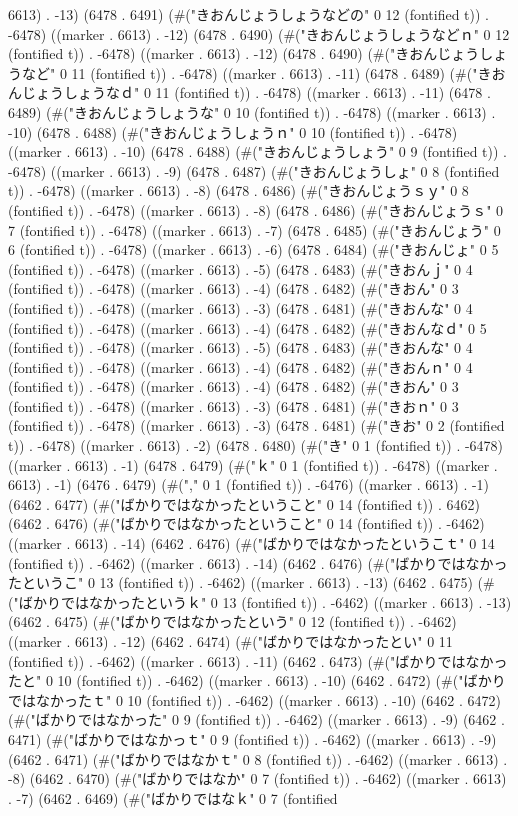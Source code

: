 6613) . -13) (6478 . 6491) (#("きおんじょうしょうなどの" 0 12 (fontified t)) . -6478) ((marker . 6613) . -12) (6478 . 6490) (#("きおんじょうしょうなどｎ" 0 12 (fontified t)) . -6478) ((marker . 6613) . -12) (6478 . 6490) (#("きおんじょうしょうなど" 0 11 (fontified t)) . -6478) ((marker . 6613) . -11) (6478 . 6489) (#("きおんじょうしょうなｄ" 0 11 (fontified t)) . -6478) ((marker . 6613) . -11) (6478 . 6489) (#("きおんじょうしょうな" 0 10 (fontified t)) . -6478) ((marker . 6613) . -10) (6478 . 6488) (#("きおんじょうしょうｎ" 0 10 (fontified t)) . -6478) ((marker . 6613) . -10) (6478 . 6488) (#("きおんじょうしょう" 0 9 (fontified t)) . -6478) ((marker . 6613) . -9) (6478 . 6487) (#("きおんじょうしょ" 0 8 (fontified t)) . -6478) ((marker . 6613) . -8) (6478 . 6486) (#("きおんじょうｓｙ" 0 8 (fontified t)) . -6478) ((marker . 6613) . -8) (6478 . 6486) (#("きおんじょうｓ" 0 7 (fontified t)) . -6478) ((marker . 6613) . -7) (6478 . 6485) (#("きおんじょう" 0 6 (fontified t)) . -6478) ((marker . 6613) . -6) (6478 . 6484) (#("きおんじょ" 0 5 (fontified t)) . -6478) ((marker . 6613) . -5) (6478 . 6483) (#("きおんｊ" 0 4 (fontified t)) . -6478) ((marker . 6613) . -4) (6478 . 6482) (#("きおん" 0 3 (fontified t)) . -6478) ((marker . 6613) . -3) (6478 . 6481) (#("きおんな" 0 4 (fontified t)) . -6478) ((marker . 6613) . -4) (6478 . 6482) (#("きおんなｄ" 0 5 (fontified t)) . -6478) ((marker . 6613) . -5) (6478 . 6483) (#("きおんな" 0 4 (fontified t)) . -6478) ((marker . 6613) . -4) (6478 . 6482) (#("きおんｎ" 0 4 (fontified t)) . -6478) ((marker . 6613) . -4) (6478 . 6482) (#("きおん" 0 3 (fontified t)) . -6478) ((marker . 6613) . -3) (6478 . 6481) (#("きおｎ" 0 3 (fontified t)) . -6478) ((marker . 6613) . -3) (6478 . 6481) (#("きお" 0 2 (fontified t)) . -6478) ((marker . 6613) . -2) (6478 . 6480) (#("き" 0 1 (fontified t)) . -6478) ((marker . 6613) . -1) (6478 . 6479) (#("ｋ" 0 1 (fontified t)) . -6478) ((marker . 6613) . -1) (6476 . 6479) (#("," 0 1 (fontified t)) . -6476) ((marker . 6613) . -1) (6462 . 6477) (#("ばかりではなかったということ" 0 14 (fontified t)) . 6462) (6462 . 6476) (#("ばかりではなかったということ" 0 14 (fontified t)) . -6462) ((marker . 6613) . -14) (6462 . 6476) (#("ばかりではなかったというこｔ" 0 14 (fontified t)) . -6462) ((marker . 6613) . -14) (6462 . 6476) (#("ばかりではなかったというこ" 0 13 (fontified t)) . -6462) ((marker . 6613) . -13) (6462 . 6475) (#("ばかりではなかったというｋ" 0 13 (fontified t)) . -6462) ((marker . 6613) . -13) (6462 . 6475) (#("ばかりではなかったという" 0 12 (fontified t)) . -6462) ((marker . 6613) . -12) (6462 . 6474) (#("ばかりではなかったとい" 0 11 (fontified t)) . -6462) ((marker . 6613) . -11) (6462 . 6473) (#("ばかりではなかったと" 0 10 (fontified t)) . -6462) ((marker . 6613) . -10) (6462 . 6472) (#("ばかりではなかったｔ" 0 10 (fontified t)) . -6462) ((marker . 6613) . -10) (6462 . 6472) (#("ばかりではなかった" 0 9 (fontified t)) . -6462) ((marker . 6613) . -9) (6462 . 6471) (#("ばかりではなかっｔ" 0 9 (fontified t)) . -6462) ((marker . 6613) . -9) (6462 . 6471) (#("ばかりではなかｔ" 0 8 (fontified t)) . -6462) ((marker . 6613) . -8) (6462 . 6470) (#("ばかりではなか" 0 7 (fontified t)) . -6462) ((marker . 6613) . -7) (6462 . 6469) (#("ばかりではなｋ" 0 7 (fontified 